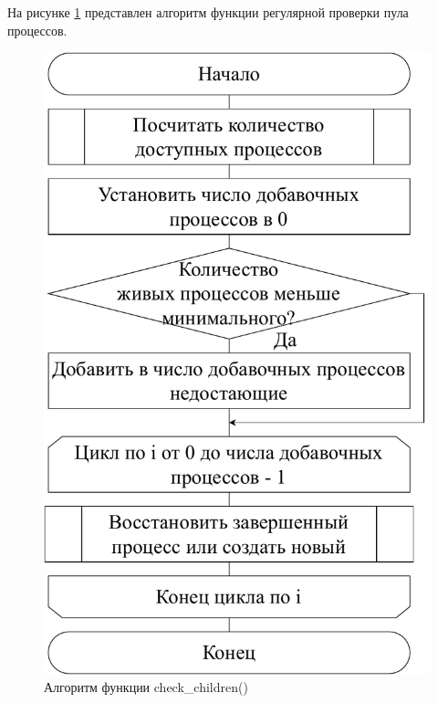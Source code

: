 На рисунке \ref{scheme-check-children} представлен алгоритм функции регулярной проверки пула процессов.

\begin{figure}[H]
	\centering
	\includegraphics[scale=0.6]{img/check_children.pdf}
	\caption{Алгоритм функции check\_children()}
	\label{scheme-check-children}
\end{figure}

\pagebreak